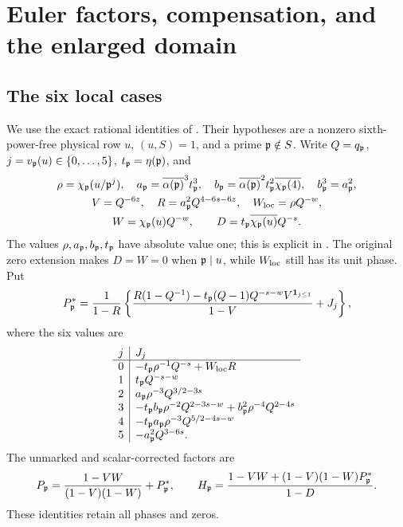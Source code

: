 \section{Euler factors, compensation, and the enlarged domain}\label{sec:euler}
\subsection{The six local cases}
We use the exact rational identities of . Their hypotheses are a nonzero sixth-power-free physical row $u$, $(u,S)=1$, and a prime $\mathfrak p\notin S$. Write $Q=q_\mathfrak p$, $j=v_\mathfrak p(u)\in\{0,\ldots,5\}$, $t_\mathfrak p=\eta(\mathfrak p)$, and
\begin{gather*}
 \rho=\chi_\mathfrak p(u/\mathfrak p^j),\quad
 a_\mathfrak p=\overline{\alpha(\mathfrak p)}^{3}t_\mathfrak p^3,\quad
 b_\mathfrak p=\overline{\alpha(\mathfrak p)}^{2}t_\mathfrak p^2\overline{\chi_\mathfrak p(4)},\quad b_\mathfrak p^3=a_\mathfrak p^2,\\
 V=Q^{-6z},\quad R=a_\mathfrak p^2Q^{4-6s-6z},\quad W_{\rm loc}=\rho Q^{-w},\\
 W=\chi_\mathfrak p(u)Q^{-w},\qquad D=t_\mathfrak p\overline{\chi_\mathfrak p(u)}Q^{-s}.
\end{gather*}
The values $\rho,a_\mathfrak p,b_\mathfrak p,t_\mathfrak p$ have absolute value one; this is explicit in . The original zero extension makes $D=W=0$ when $\mathfrak p\mid u$, while $W_{\rm loc}$ still has its unit phase. Put
\begin{equation}\label{eq:localtable}
 P_\mathfrak p^*=\frac1{1-R}\left\{
 \frac{R(1-Q^{-1})-t_\mathfrak p(Q-1)Q^{-s-w}V^{\mathbf 1_{j\le1}}}{1-V}+J_j\right\},
\end{equation}
where the six values are
\[
\begin{array}{c|l}
 j&J_j\\ \hline
 0&-t_\mathfrak p\rho^{-1}Q^{-s}+W_{\rm loc}R\\
 1&t_\mathfrak p Q^{-s-w}\\
 2&a_\mathfrak p\rho^{-3}Q^{3/2-3s}\\
 3&-t_\mathfrak p b_\mathfrak p\rho^{-2}Q^{2-3s-w}+b_\mathfrak p^2\rho^{-4}Q^{2-4s}\\
 4&-t_\mathfrak p a_\mathfrak p\rho^{-3}Q^{5/2-4s-w}\\
 5&-a_\mathfrak p^2Q^{3-6s}.
\end{array}
\]
The unmarked and scalar-corrected factors are
\begin{equation}\label{eq:HP}
 P_\mathfrak p=\frac{1-VW}{(1-V)(1-W)}+P_\mathfrak p^*,\qquad
 H_\mathfrak p=\frac{1-VW+(1-V)(1-W)P_\mathfrak p^*}{1-D}.
\end{equation}
These identities retain all phases and zeros.

